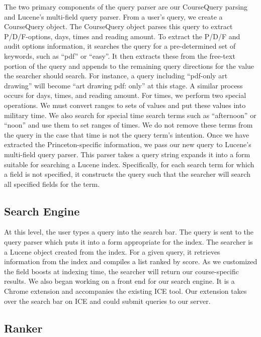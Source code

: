 \documentclass[12pt,letterpaper]{article}
\begin{document}
The two primary components of the query parser are our CourseQuery parsing and Lucene's multi-field query parser. From a user's query, we create a CourseQuery object. The CourseQuery object parses this query to extract P/D/F-options, days, times and reading amount. To extract the P/D/F and audit options information, it searches the query for a pre-determined set of keywords, such as ``pdf'' or ``easy''. It then extracts these from the free-text portion of the query and appends to the remaining query directions for the value the searcher should search. For instance, a query including ``pdf-only art drawing'' will become ``art drawing pdf: only'' at this stage. A similar process occurs for days, times, and reading amount.
For times, we perform two special operations. We must convert ranges to sets of values and put these values into military time. We also search for special time search terms such as ``afternoon'' or ``noon'' and use them to set ranges of times. We do not remove these terms from the query in the case that time is not the query term's intention. Once we have extracted the Princeton-specific information, we pass our new query to Lucene's multi-field query parser. This parser takes a query string expands it into a form suitable for searching a Lucene index. Specifically, for each search term for which a field is not specified, it constructs the query such that the searcher will search all specified fields for the term. 
	
\subsection{Search Engine}
At this level, the user types a query into the search bar. The query is sent to the query parser which puts it into a form appropriate for the index. The searcher is a Lucene object created from the index. For a given query, it retrieves information from the index and compiles a list ranked by score. As we customized the field boosts at indexing time, the searcher will return our course-specific results. We also began working on a front end for our search engine. It is a Chrome extension and accompanies the existing ICE tool. Our extension takes over the search bar on ICE and could submit queries to our server. 				
		
\subsection{Ranker}
\end{document}
